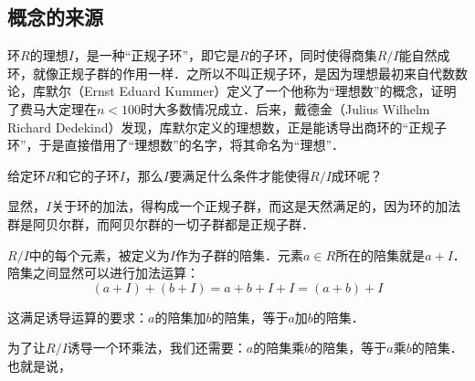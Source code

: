 
\subsection{概念的来源}

环$R$的理想$I$，是一种“正规子环”，即它是$R$的子环，同时使得商集$R/I$能自然成环，就像正规子群的作用一样．之所以不叫正规子环，是因为理想最初来自代数数论，库默尔（Ernst Eduard Kummer）定义了一个他称为“理想数”的概念，证明了费马大定理在$n<100$时大多数情况成立．后来，戴德金（Julius Wilhelm Richard Dedekind）发现，库默尔定义的理想数，正是能诱导出商环的“正规子环”，于是直接借用了“理想数”的名字，将其命名为“理想”．

给定环$R$和它的子环$I$，那么$I$要满足什么条件才能使得$R/I$成环呢？

显然，$I$关于环的加法，得构成一个正规子群，而这是天然满足的，因为环的加法群是阿贝尔群，而阿贝尔群的一切子群都是正规子群．

$R/I$中的每个元素，被定义为$I$作为子群的陪集．元素$a\in R$所在的陪集就是$a+I$．陪集之间显然可以进行加法运算：
\begin{equation}
(a+I)+(b+I)=a+b+I+I=(a+b)+I
\end{equation}

这满足诱导运算的要求：$a$的陪集加$b$的陪集，等于$a$加$b$的陪集．

为了让$R/I$诱导一个环乘法，我们还需要：$a$的陪集乘$b$的陪集，等于$a$乘$b$的陪集．也就是说，
\begin{equation}

\end{equation}


